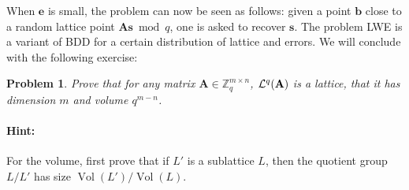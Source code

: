 \documentclass[12pt]{article}
\renewcommand{\vec}{\mathbf}
\newcommand{\Z}{\mathbb Z}
\newtheorem{problem}{Problem}{\bfseries}{\upshape}
\newcommand{\Vol}{\operatorname{Vol}}
\begin{document}
When $\vec e$ is small, the problem can now be seen as follows: given a point $\vec b$ close to a random lattice point $ \vec A \vec s \bmod q$, one is asked to recover $\vec s$. The problem LWE is a variant of BDD for a certain distribution of lattice and errors. We will conclude with the following exercise:
\begin{problem}
  Prove that for any matrix $\vec A \in \Z_q^{m \times n}$, $\cL^{q}(\vec A)$ is a lattice, that it has dimension $m$ and volume $q^{m-n}$. 
\end{problem}
\paragraph{Hint:} For the volume, first prove that if $L'$ is a sublattice $L$, then the quotient group $L/L'$ has size $\Vol(L')/\Vol(L)$.
\end{document}
